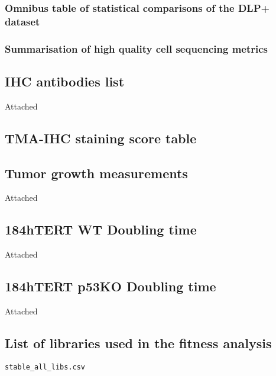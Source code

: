 \documentclass{article}
\begin{document}
\subsubsection{Omnibus table of statistical comparisons of the DLP+ dataset}

\subsubsection{Summarisation of high quality cell sequencing metrics}

\begin{comment}
passed/failed is simply if quality >= 0.75 or not, the number of cells that fall into these categories (edited) 
cells is total number of cells in the library
success_rate == passed / total cells
live_cells is cells with cell_state == C1
dead_cells is cells with cell_state == C2
\end{comment}



\subsection{IHC antibodies list}
Attached
\subsection{TMA-IHC staining score table}
\subsection{Tumor growth measurements}
Attached
\subsection{184hTERT WT Doubling time}
Attached
\subsection{184hTERT p53KO Doubling time}
Attached
\subsection{List of libraries used in the fitness analysis}
\texttt{stable\_all\_libs.csv}
\end{document}
